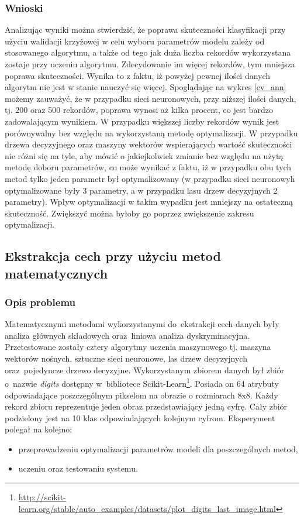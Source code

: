 \subsubsection{Wnioski}
Analizując wyniki można stwierdzić, że poprawa skuteczności klasyfikacji przy użyciu walidacji krzyżowej w celu wyboru parametrów modelu zależy od stosowanego algorytmu, a także od tego jak duża liczba rekordów wykorzystana zostaje przy uczeniu algorytmu. Zdecydowanie im więcej rekordów, tym mniejsza poprawa skuteczności. Wynika to z faktu, iż powyżej pewnej ilości danych algorytm nie jest w stanie nauczyć się więcej. Spoglądając na wykres \ref{cv_ann} możemy zauważyć, że w przypadku sieci neuronowych, przy niższej ilości danych, tj. 200 oraz 500 rekordów, poprawa wynosi aż kilka procent, co jest bardzo zadowalającym wynikiem. W przypadku większej liczby rekordów wynik jest porównywalny bez względu na wykorzystaną metodę optymalizacji. W przypadku drzewa decyzyjnego oraz maszyny wektorów wspierających wartość skuteczności nie różni się na tyle, aby mówić o jakiejkolwiek zmianie bez względu na użytą metodę doboru parametrów, co może wynikać z faktu, iż w przypadku obu tych metod tylko jeden parametr był optymalizowany (w przypadku sieci neuronowyh optymalizowane były 3 parametry, a w przypadku lasu drzew decyzyjnych 2 parametry). Wpływ optymalizacji w takim wypadku jest mniejszy na ostateczną skuteczność. Zwiększyć można byłoby go poprzez zwiększenie zakresu optymalizacji.

\subsection{Ekstrakcja cech przy użyciu metod matematycznych}

\subsubsection{Opis problemu}
Matematycznymi metodami wykorzystanymi do~ekstrakcji cech danych były analiza głównych składowych oraz~liniowa analiza dyskryminacyjna. Przetestowane zostały cztery algorytmy uczenia maszynowego tj. maszyna wektorów nośnych, sztuczne sieci neuronowe, las drzew decyzyjnych oraz~pojedyncze drzewo decyzyjne. Wykorzystanym zbiorem danych był zbiór o~nazwie \textit{digits} dostępny w~bibliotece Scikit-Learn\footnote{\url{http://scikit-learn.org/stable/auto_examples/datasets/plot_digits_last_image.html}}. Posiada on 64 atrybuty odpowiadające poszczególnym pikselom na obrazie o rozmiarach 8x8. Każdy rekord zbioru reprezentuje jeden obraz przedstawiający jedną cyfrę. Cały zbiór podzielony jest na 10 klas odpowiadających kolejnym cyfrom. Eksperyment polegał na kolejno:
\begin{itemize}

\item przeprowadzeniu optymalizacji parametrów modeli dla poszczególnych metod,
\item uczeniu oraz testowaniu systemu.

\end{itemize}

